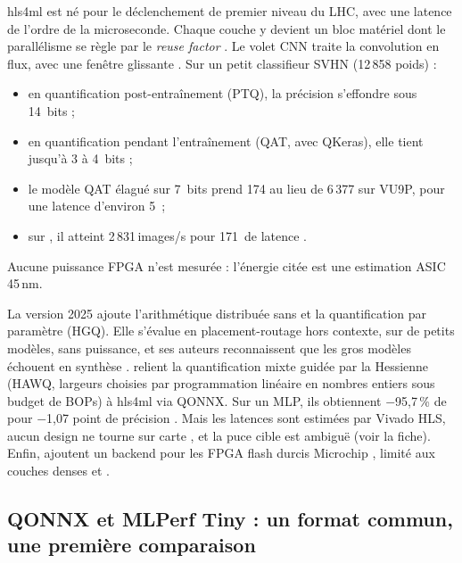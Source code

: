 hls4ml est né pour le déclenchement de premier niveau du LHC, avec une latence de l'ordre
de la microseconde. Chaque couche y devient un bloc matériel dont le parallélisme se règle
par le \emph{reuse factor}
\citep[§4.2]{arxiv-2103.05579-hls4ml-open-source-codesign-workflow}. Le volet CNN
\citep{arxiv-2101.05108-fast-convolutional-neural-networks-fpgas} traite la convolution en
flux, avec une fenêtre glissante . Sur un petit classifieur SVHN (12\,858 poids) :
\begin{itemize}
  \item en quantification post-entraînement (PTQ), la précision s'effondre sous 14~bits ;
  \item en quantification pendant l'entraînement (QAT, avec QKeras), elle tient jusqu'à 3
    à 4~bits  ;
  \item le modèle QAT élagué sur 7~bits prend 174  au lieu de 6\,377 sur VU9P, pour une
    latence d'environ 5\,  ;
  \item sur , il atteint 2\,831\,images/s pour 171\, de latence .
\end{itemize}
Aucune puissance FPGA n'est mesurée : l'énergie citée est une estimation ASIC 45\,nm.

La version 2025 \citep{arxiv-2512.01463-hls4ml-flexible-open-source-platform}\pp{} ajoute
l'arithmétique distribuée sans  et la quantification par paramètre (HGQ). Elle s'évalue
en placement-routage hors contexte, sur de petits modèles, sans puissance, et ses auteurs
reconnaissent que les gros modèles échouent en synthèse .
\citet{2024-campos-end-end-codesign-hessian-aware} relient la quantification mixte guidée
par la Hessienne (HAWQ, largeurs choisies par programmation linéaire en nombres entiers
sous budget de BOPs) à hls4ml via QONNX. Sur un MLP, ils obtiennent $-$95,7\,\% de 
pour $-$1,07 point de précision . Mais les latences sont estimées par Vivado
HLS, aucun design ne tourne sur carte , et la puce cible est ambiguë (voir la
fiche). Enfin, \citet{arxiv-2602.15751-enabling-low-latency-machine-learning} ajoutent un
backend pour les FPGA flash durcis Microchip , limité aux couches denses et 
.

\subsection{QONNX et MLPerf Tiny : un format commun, une première comparaison}

